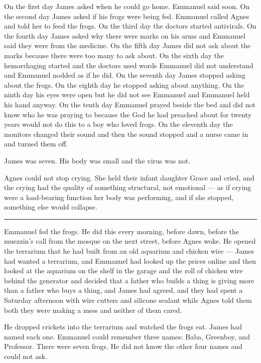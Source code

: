 On the first day James asked when he could go home. Emmanuel said soon. On the second day James asked if his frogs were being fed. Emmanuel called Agnes and told her to feed the frogs. On the third day the doctors started antivirals. On the fourth day James asked why there were marks on his arms and Emmanuel said they were from the medicine. On the fifth day James did not ask about the marks because there were too many to ask about. On the sixth day the hemorrhaging started and the doctors used words Emmanuel did not understand and Emmanuel nodded as if he did. On the seventh day James stopped asking about the frogs. On the eighth day he stopped asking about anything. On the ninth day his eyes were open but he did not see Emmanuel and Emmanuel held his hand anyway. On the tenth day Emmanuel prayed beside the bed and did not know who he was praying to because the God he had preached about for twenty years would not do this to a boy who loved frogs. On the eleventh day the monitors changed their sound and then the sound stopped and a nurse came in and turned them off.

James was seven. His body was small and the virus was not.

Agnes could not stop crying. She held their infant daughter Grace and cried, and the crying had the quality of something structural, not emotional --- as if crying were a load-bearing function her body was performing, and if she stopped, something else would collapse.

\begin{center}\rule{0.3\linewidth}{0.4pt}\end{center}

Emmanuel fed the frogs. He did this every morning, before dawn, before the muezzin's call from the mosque on the next street, before Agnes woke. He opened the terrarium that he had built from an old aquarium and chicken wire --- James had wanted a terrarium, and Emmanuel had looked up the prices online and then looked at the aquarium on the shelf in the garage and the roll of chicken wire behind the generator and decided that a father who builds a thing is giving more than a father who buys a thing, and James had agreed, and they had spent a Saturday afternoon with wire cutters and silicone sealant while Agnes told them both they were making a mess and neither of them cared.

He dropped crickets into the terrarium and watched the frogs eat. James had named each one. Emmanuel could remember three names: Baba, Greenboy, and Professor. There were seven frogs. He did not know the other four names and could not ask.

